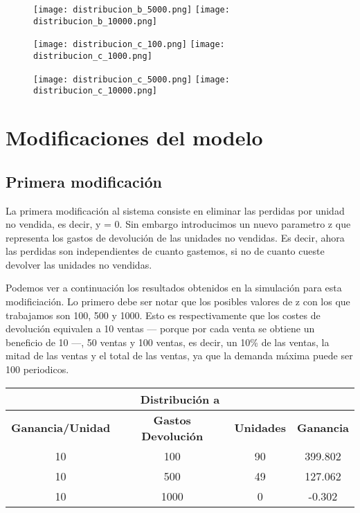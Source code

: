 \begin{figure}[H]
	\centering
	\texttt{[image: distribucion\_b\_5000.png]}
	\texttt{[image: distribucion\_b\_10000.png]}
\end{figure}

\begin{figure}[H]
	\centering
	\texttt{[image: distribucion\_c\_100.png]}
	\texttt{[image: distribucion\_c\_1000.png]}
\end{figure}

\begin{figure}[H]
	\centering
	\texttt{[image: distribucion\_c\_5000.png]}
	\texttt{[image: distribucion\_c\_10000.png]}
\end{figure}



\section{Modificaciones del modelo}

\subsection{Primera modificación}
La primera modificación al sistema consiste en eliminar las perdidas por unidad no vendida, es decir, y = 0. Sin embargo introducimos un nuevo parametro z que representa los gastos de devolución de las unidades no vendidas. Es decir, ahora las perdidas son independientes de cuanto gastemos, si no de cuanto cueste devolver las unidades no vendidas.

Podemos ver a continuación los resultados obtenidos en la simulación para esta modificiación. Lo primero debe ser notar que los posibles valores de z con los que trabajamos son 100, 500 y 1000. Esto es respectivamente que los costes de devolución equivalen a 10 ventas --- porque por cada venta se obtiene un beneficio de 10 ---, 50 ventas y 100 ventas, es decir, un 10\% de las ventas, la mitad de las ventas y el total de las ventas, ya que la demanda máxima puede ser 100 periodicos.


\begin{table}[H]
\centering
\begin{tabular}{|c|c|c|c|}
\hline
\multicolumn{4}{|c|}{\textbf{Distribución a}} \\ \hline
\textbf{Ganancia/Unidad} & \textbf{Gastos Devolución} & \textbf{Unidades} & \textbf{Ganancia} \\ \hline
10 & 100 & 90 & 399.802 \\
10 & 500 & 49 & 127.062 \\
10 & 1000 & 0 & -0.302 \\ \hline
\end{tabular}
\end{table}

